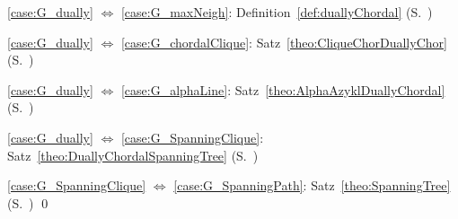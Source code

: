 \begin{Proof}

    
    \ref{case:G_dually} $\Leftrightarrow$ \ref{case:G_maxNeigh}:  Definition~\ref{def:duallyChordal} (S.~\pageref{def:duallyChordal})
    
    \ref{case:G_dually} $\Leftrightarrow$ \ref{case:G_chordalClique}:  Satz~\ref{theo:CliqueChorDuallyChor} (S.~\pageref{theo:CliqueChorDuallyChor})
    
    \ref{case:G_dually} $\Leftrightarrow$ \ref{case:G_alphaLine}:  Satz~\ref{theo:AlphaAzyklDuallyChordal} (S.~\pageref{theo:AlphaAzyklDuallyChordal})

    \ref{case:G_dually} $\Leftrightarrow$ \ref{case:G_SpanningClique}:  Satz~\ref{theo:DuallyChordalSpanningTree} (S.~\pageref{theo:DuallyChordalSpanningTree})

    \ref{case:G_SpanningClique} $\Leftrightarrow$ \ref{case:G_SpanningPath}:  Satz~\ref{theo:SpanningTree} (S.~\pageref{theo:SpanningTree})
\qed
\end{Proof}